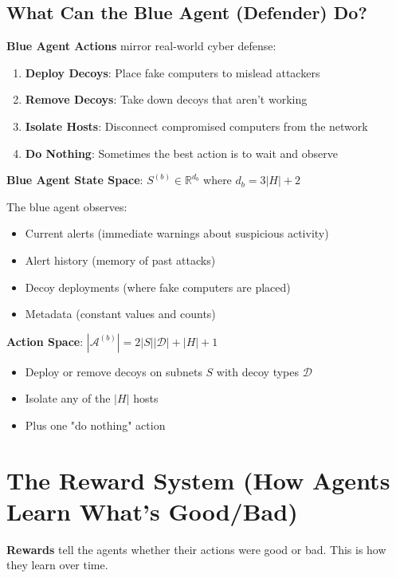 \documentclass[11pt]{article}
\begin{document}
\subsection{What Can the Blue Agent (Defender) Do?}

\begin{intuition}
\textbf{Blue Agent Actions} mirror real-world cyber defense:
\begin{enumerate}
\item \textbf{Deploy Decoys}: Place fake computers to mislead attackers
\item \textbf{Remove Decoys}: Take down decoys that aren't working
\item \textbf{Isolate Hosts}: Disconnect compromised computers from the network
\item \textbf{Do Nothing}: Sometimes the best action is to wait and observe
\end{enumerate}
\end{intuition}

\begin{mathdetails}
\textbf{Blue Agent State Space}: $S^{(b)} \in \mathbb{R}^{d_b}$ where $d_b = 3|H| + 2$

The blue agent observes:
\begin{itemize}
\item Current alerts (immediate warnings about suspicious activity)
\item Alert history (memory of past attacks)
\item Decoy deployments (where fake computers are placed)
\item Metadata (constant values and counts)
\end{itemize}

\textbf{Action Space}: $|\mathcal{A}^{(b)}| = 2|S||\mathcal{D}| + |H| + 1$
\begin{itemize}
\item Deploy or remove decoys on subnets $S$ with decoy types $\mathcal{D}$
\item Isolate any of the $|H|$ hosts
\item Plus one "do nothing" action
\end{itemize}
\end{mathdetails}

\section{The Reward System (How Agents Learn What's Good/Bad)}

\begin{foundation}
\textbf{Rewards} tell the agents whether their actions were good or bad. This is how they learn over time.
\end{foundation}
\end{document}
